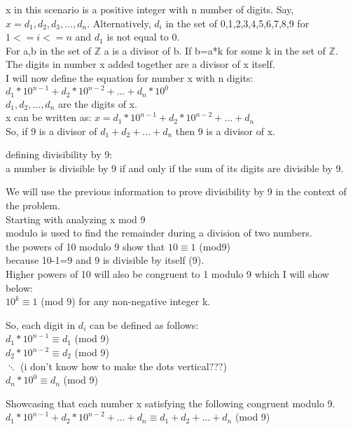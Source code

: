 \documentclass[10pt, AMS Euler]{article}
\newcommand{\Z}{\mathbb{Z}}
\begin{document}
\begin{enumerate}
x in this scenario is a positive integer with n number of digits. Say, $x =d_{1},d_{2},d_{3},...,d_{n}$. Alternatively, $d_{i}$ in the set of {0,1,2,3,4,5,6,7,8,9} for $1 <= i <= n$ and $d_{1}$ is not equal to 0.  \\
For a,b in the set of $\Z$ a is a divisor of b. If b=a*k for some k in the set of $\Z$. \\
The digits in number x added together are a divisor of x itself.  \\
I will now define the equation for number x with n digits: \\
$d_{1}*10^{n-1}+d_{2}*10^{n-2}+...+d_{n}*10^{0}$ \\
$d_{1},d_{2},...,d_{n}$ are the digits of x.\\ 
x can be written as: $x=d_{1}*10^{n-1}+d_{2}*10^{n-2}+...+d_{n}$ \\
So, if 9 is a divisor of $d_{1}+d_{2}+...+d_{n}$ then 9 is a divisor of x.

defining divisibility by 9: \\
a number is divisible by 9 if and only if the sum of its digits are divisible by 9. \\
\end{enumerate}
We will use the previous information to prove divisibility by 9 in the context of the problem. \\
Starting with analyzing x mod 9\\
modulo is used to find the remainder during a division of two numbers. \\
the powers of 10 modulo 9 show that $10 \equiv 1$ (mod9)\\
because 10-1=9 and 9 is divisible by itself (9).\\
Higher powers of 10 will also be congruent to 1 modulo 9 which I will show below: \\
$10^{k} \equiv 1$ (mod 9) for any non-negative integer k.

So, each digit in $d_{i}$ can be defined as follows: \\
$d_{1}*10^{n-1} \equiv d_{1}$ (mod 9) \\
$d_{2}*10^{n-2} \equiv d_{2}$ (mod 9) \\
$\ddots$ (i don't know how to make the dots vertical???) \\
$d_{n}*10^{0} \equiv d_{n}$ (mod 9)

Showcasing that each number x satisfying the following congruent modulo 9. \\
$d_{1}*10^{n-1} + d_{2}*10^{n-2}+...+d_{n} \equiv d_{1} + d_{2} +...+ d_{n}$ (mod 9) \\
\end{document}
